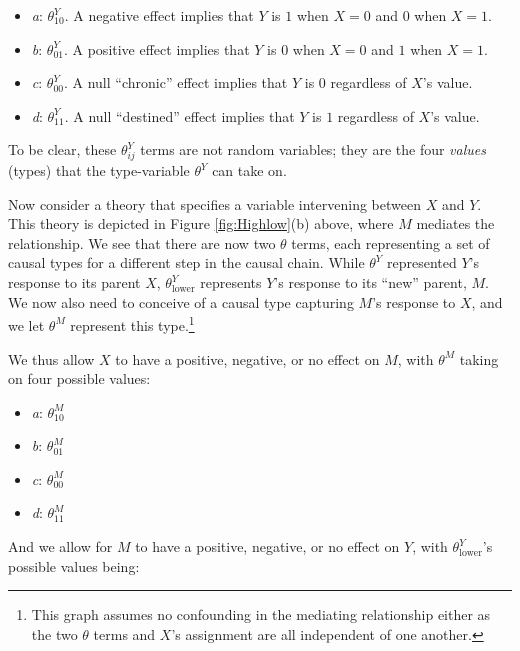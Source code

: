 \documentclass[12pt,]{book}
\providecommand{\tightlist}{%
  \setlength{\itemsep}{0pt}\setlength{\parskip}{0pt}}
\let\rmarkdownfootnote\footnote%
\def\footnote{\protect\rmarkdownfootnote}
\begin{document}
\begin{itemize}
\tightlist
\item
  \emph{a}: \(\theta_{10}^Y\). A negative effect implies that \(Y\) is \(1\) when \(X=0\) and \(0\) when \(X=1\).
\item
  \emph{b}: \(\theta_{01}^Y\). A positive effect implies that \(Y\) is \(0\) when \(X=0\) and \(1\) when \(X=1\).
\item
  \emph{c}: \(\theta_{00}^Y\). A null ``chronic'' effect implies that \(Y\) is \(0\) regardless of \(X\)'s value.
\item
  \emph{d}: \(\theta_{11}^Y\). A null ``destined'' effect implies that \(Y\) is \(1\) regardless of \(X\)'s value.
\end{itemize}

To be clear, these \(\theta_{ij}^Y\) terms are not random variables; they are the four \emph{values} (types) that the type-variable \(\theta^Y\) can take on.

Now consider a theory that specifies a variable intervening between \(X\) and \(Y\). This theory is depicted in Figure \ref{fig:Highlow}(b) above, where \(M\) mediates the relationship. We see that there are now two \(\theta\) terms, each representing a set of causal types for a different step in the causal chain. While \(\theta^Y\) represented \(Y\)'s response to its parent \(X\), \(\theta^Y_{\text{lower}}\) represents \(Y\)'s response to its ``new'' parent, \(M\). We now also need to conceive of a causal type capturing \(M\)'s response to \(X\), and we let \(\theta^M\) represent this type.\footnote{This graph assumes no confounding in the mediating relationship either as the two \(\theta\) terms and \(X\)'s assignment are all independent of one another.}

We thus allow \(X\) to have a positive, negative, or no effect on \(M\), with \(\theta^M\) taking on four possible values:

\begin{itemize}
\tightlist
\item
  \emph{a}: \(\theta_{10}^M\)
\item
  \emph{b}: \(\theta_{01}^M\)
\item
  \emph{c}: \(\theta_{00}^M\)
\item
  \emph{d}: \(\theta_{11}^M\)
\end{itemize}

And we allow for \(M\) to have a positive, negative, or no effect on \(Y\), with \(\theta^Y_{\text{lower}}\)'s possible values being:
\end{document}
